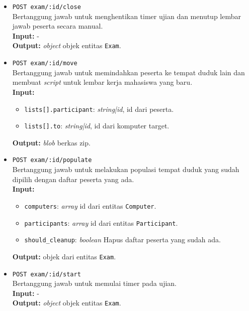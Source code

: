 \begin{itemize}
        \item \texttt{POST exam/:id/close} \\
            Bertanggung jawab untuk menghentikan timer ujian dan menutup lembar
            jawab peserta secara manual.\\
            \textbf{Input:} -\\
            \textbf{Output:} \textit{object} objek entitas \texttt{Exam}.
            
        \item \texttt{POST exam/:id/move} \\
            Bertanggung jawab untuk memindahkan peserta ke tempat duduk lain dan
            membuat \textit{script} untuk lembar kerja mahasiswa yang baru.\\
            \textbf{Input:} \begin{itemize}
                \item \texttt{lists[].participant}: \textit{string|id}, id dari peserta.
                \item \texttt{lists[].to}: \textit{string|id}, id dari komputer target.
            \end{itemize}
            \textbf{Output:} \textit{blob} berkas zip.
            
        \item \texttt{POST exam/:id/populate} \\
            Bertanggung jawab untuk melakukan populasi tempat duduk yang sudah
            dipilih dengan daftar peserta yang ada.\\
            \textbf{Input:} \begin{itemize}
                \item \texttt{computers}: \textit{array} id dari entitas
                    \texttt{Computer}.
                \item \texttt{participants}: \textit{array} id dari entitas
                    \texttt{Participant}.
                \item \texttt{should\_cleanup}: \textit{boolean} Hapus daftar
                    peserta yang sudah ada.
            \end{itemize}
            \textbf{Output:} objek dari entitas \texttt{Exam}.
            
        \item \texttt{POST exam/:id/start} \\
            Bertanggung jawab untuk memulai timer pada ujian.\\
            \textbf{Input:} -\\
            \textbf{Output:} \textit{object} objek entitas \texttt{Exam}.
            

\end{itemize}

